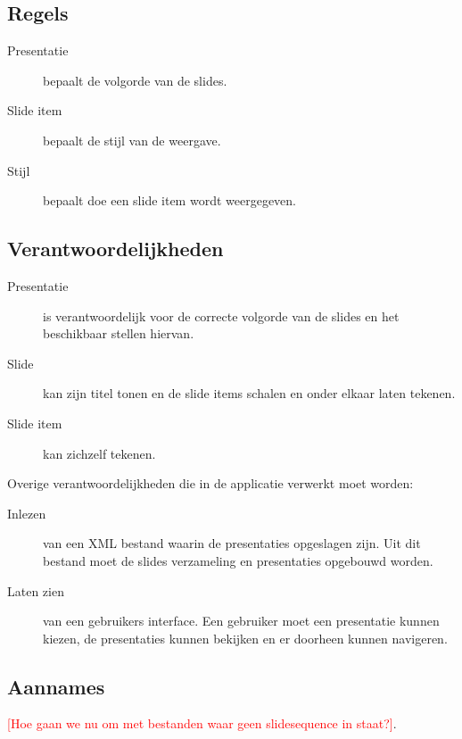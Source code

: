 \documentclass[a4paper]{article}
\newcommand{\todo}[1]{\textcolor{red}{[#1]}}
\begin{document}
\subsection{Regels}
\begin{description}
\item[Presentatie] bepaalt de volgorde van de slides.
\item[Slide item] bepaalt de stijl van de weergave.
\item[Stijl] bepaalt doe een slide item wordt weergegeven. 
\end{description}

\subsection{Verantwoordelijkheden}
\begin{description}
\item[Presentatie] is verantwoordelijk voor de correcte volgorde van de slides en het beschikbaar stellen hiervan. 
\item[Slide] kan zijn titel tonen en de slide items schalen en onder elkaar laten tekenen.
\item[Slide item] kan zichzelf tekenen.
\end{description}
Overige verantwoordelijkheden die in de applicatie verwerkt moet worden:
\begin{description}
\item[Inlezen] van een XML bestand waarin de presentaties opgeslagen zijn. Uit dit bestand moet de slides verzameling en presentaties opgebouwd worden.
\item[Laten zien] van een gebruikers interface. Een gebruiker moet een presentatie kunnen kiezen, de presentaties kunnen bekijken en er doorheen kunnen navigeren.
\end{description}

\subsection{Aannames}
\todo{Hoe gaan we nu om met bestanden waar geen slidesequence in staat?}.
\end{document}
